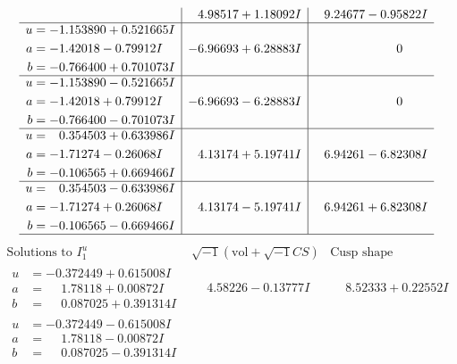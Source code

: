 \documentclass[1p]{elsarticle_modified}
\theoremstyle{definition}
\newcommand{\I}{\sqrt{-1}}
\begin{document}
$$\begin{array}{c|c|c}
 & \phantom{-}4.98517 + 1.18092 I & \phantom{-}9.24677 - 0.95822 I \\ \hline\begin{aligned}
u &= -1.153890 + 0.521665 I \\
a &= -1.42018 - 0.79912 I \\
b &= -0.766400 + 0.701073 I\end{aligned}
 & -6.96693 + 6.28883 I & \phantom{-0.000000 } 0 \\ \hline\begin{aligned}
u &= -1.153890 - 0.521665 I \\
a &= -1.42018 + 0.79912 I \\
b &= -0.766400 - 0.701073 I\end{aligned}
 & -6.96693 - 6.28883 I & \phantom{-0.000000 } 0 \\ \hline\begin{aligned}
u &= \phantom{-}0.354503 + 0.633986 I \\
a &= -1.71274 - 0.26068 I \\
b &= -0.106565 + 0.669466 I\end{aligned}
 & \phantom{-}4.13174 + 5.19741 I & \phantom{-}6.94261 - 6.82308 I \\ \hline\begin{aligned}
u &= \phantom{-}0.354503 - 0.633986 I \\
a &= -1.71274 + 0.26068 I \\
b &= -0.106565 - 0.669466 I\end{aligned}
 & \phantom{-}4.13174 - 5.19741 I & \phantom{-}6.94261 + 6.82308 I\\
 \hline 
 \end{array}$$\newpage$$\begin{array}{c|c|c}  
\text{Solutions to }I^u_{1}& \I (\text{vol} + \sqrt{-1}CS) & \text{Cusp shape}\\
 \hline 
\begin{aligned}
u &= -0.372449 + 0.615008 I \\
a &= \phantom{-}1.78118 + 0.00872 I \\
b &= \phantom{-}0.087025 + 0.391314 I\end{aligned}
 & \phantom{-}4.58226 - 0.13777 I & \phantom{-}8.52333 + 0.22552 I \\ \hline\begin{aligned}
u &= -0.372449 - 0.615008 I \\
a &= \phantom{-}1.78118 - 0.00872 I \\
b &= \phantom{-}0.087025 - 0.391314 I\end{aligned}

\end{array}$$
\end{document}
